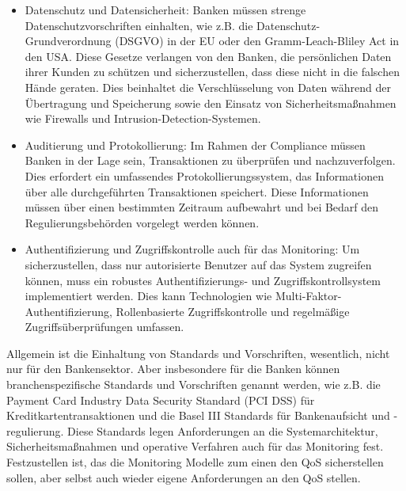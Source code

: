 \begin{itemize}
\item Datenschutz und Datensicherheit: Banken müssen strenge Datenschutzvorschriften einhalten, wie z.B. die Datenschutz-Grundverordnung (DSGVO) in der EU oder den Gramm-Leach-Bliley Act in den USA. Diese Gesetze verlangen von den Banken, die persönlichen Daten ihrer Kunden zu schützen und sicherzustellen, dass diese nicht in die falschen Hände geraten. Dies beinhaltet die Verschlüsselung von Daten während der Übertragung und Speicherung sowie den Einsatz von Sicherheitsmaßnahmen wie Firewalls und Intrusion-Detection-Systemen.
\item Auditierung und Protokollierung: Im Rahmen der Compliance müssen Banken in der Lage sein, Transaktionen zu überprüfen und nachzuverfolgen. Dies erfordert ein umfassendes Protokollierungssystem, das Informationen über alle durchgeführten Transaktionen speichert. Diese Informationen müssen über einen bestimmten Zeitraum aufbewahrt und bei Bedarf den Regulierungsbehörden vorgelegt werden können.
\item Authentifizierung und Zugriffskontrolle auch für das Monitoring: Um sicherzustellen, dass nur autorisierte Benutzer auf das System zugreifen können, muss ein robustes Authentifizierungs- und Zugriffskontrollsystem implementiert werden. Dies kann Technologien wie Multi-Faktor-Authentifizierung, Rollenbasierte Zugriffskontrolle und regelmäßige Zugriffsüberprüfungen umfassen.
\end{itemize}

Allgemein ist die Einhaltung von Standards und Vorschriften, wesentlich, nicht nur für den Bankensektor. Aber insbesondere für die Banken können branchenspezifische Standards und Vorschriften genannt werden, wie z.B. die Payment Card Industry Data Security Standard (PCI DSS) für Kreditkartentransaktionen und die Basel III Standards für Bankenaufsicht und -regulierung. Diese Standards legen Anforderungen an die Systemarchitektur, Sicherheitsmaßnahmen und operative Verfahren auch für das Monitoring fest. 
Festzustellen ist, das die Monitoring Modelle zum einen den QoS sicherstellen sollen, aber selbst auch wieder eigene Anforderungen an den QoS stellen. 


